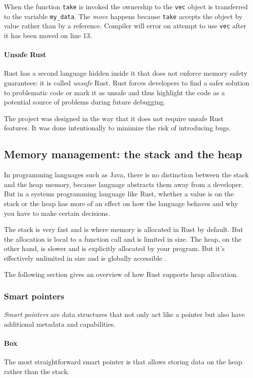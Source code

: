 When the function \texttt{take} is invoked the ownership to the \texttt{vec} object is transferred to the variable \texttt{my_data}. The \emph{move} happens because \texttt{take} accepts the object by value rather than by a reference. Compiler will error on attempt to use \texttt{vec} after it has been moved on line 13.

\paragraph{Unsafe Rust}
Rust has a second language hidden inside it that does not enforce memory safety guarantees: it is called \emph{unsafe} Rust. Rust forces developers to find a safer solution to problematic code or mark it as unsafe and thus highlight the code as a potential source of problems during future debugging.

The \pvecrs{} project was designed in the way that it does not require unsafe Rust features. It was done intentionally to minimize the risk of introducing bugs.

\subsection{Memory management: the stack and the heap}
In programming languages such as Java, there is no distinction between the stack and the heap memory, because language abstracts them away from a developer. But in a systems programming language like Rust, whether a value is on the stack or the heap has more of an effect on how the language behaves and why you have to make certain decisions.

The stack is very fast and is where memory is allocated in Rust by default. But the allocation is local to a function call and is limited in size. The heap, on the other hand, is slower and is explicitly allocated by your program. But it’s effectively unlimited in size and is globally accessible \cite{rust-book-2e}.

The following section gives an overview of how Rust supports heap allocation.

\subsubsection*{Smart pointers}
\emph{Smart pointers} are data structures that not only act like a pointer but also have additional metadata and capabilities.

\paragraph{Box}
The most straightforward smart pointer is  that allows storing data on the heap rather than the stack.

